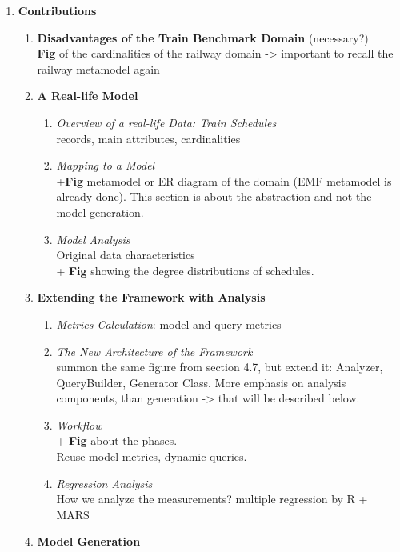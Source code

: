 \begin{enumerate}
		
	\item \textbf{Contributions}
		\begin{enumerate}[label*=\arabic*.]
			\item \textbf{Disadvantages of the Train Benchmark Domain} (necessary?)\\ 
			\textbf{Fig} of the cardinalities of the railway domain -> important to recall the railway metamodel again
			\item \textbf{A Real-life Model}
				\begin{enumerate}[label*=\arabic*.]
					\item \textit{Overview of a real-life Data: Train Schedules}\\ records, main attributes, cardinalities
					\item \textit{Mapping to a Model}\\ +\textbf{Fig} metamodel or ER diagram of the domain (EMF metamodel is already done).
					This section is about the abstraction and not the model generation.
					\item \textit{Model Analysis} \\
					Original data characteristics\\
					+ \textbf{Fig} showing the degree distributions of schedules.
				\end{enumerate}
			\item \textbf{Extending the Framework with Analysis}
			\begin{enumerate}[label*=\arabic*.]
				\item \textit{Metrics Calculation}: model and query metrics
				\item \textit{The New Architecture of the Framework} \\
						summon the same figure from section 4.7, but extend it: Analyzer, QueryBuilder, Generator Class. More emphasis on analysis components, than generation -> that will be described below.
				\item \textit{Workflow}\\
						+ \textbf{Fig} about the phases.\\
						Reuse model metrics, dynamic queries.
				\item \textit{Regression Analysis}\\ 
					How we analyze the measurements? multiple regression by R + MARS
			\end{enumerate}
			\item \textbf{Model Generation}\\ 
				\begin{enumerate}[label*=\arabic*.]

\end{enumerate}
\end{enumerate}
\end{enumerate}
